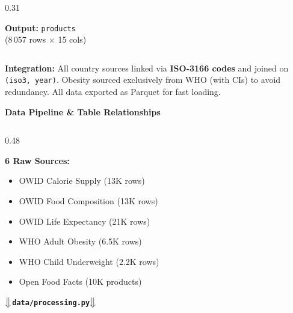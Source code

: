 \documentclass[aspectratio=169, 10pt]{beamer}
\begin{document}
\begin{frame}
\begin{columns}[T]
\begin{column}{0.31\textwidth}
\begin{tcolorbox}[obox, title={\scriptsize\bfseries Q3: What's in our food?},
      coltitle=white, colbacktitle=NOrange]
      \textbf{Output:} \texttt{products}\\(8\,057 rows $\times$ 15 cols)
    \end{tcolorbox}
  \end{column}
\end{columns}
\vspace{3pt}
\begin{tcolorbox}[dbox]
  \footnotesize
  \textbf{Integration:} All country sources linked via \textbf{ISO-3166 codes}
  and joined on \texttt{(iso3, year)}. Obesity sourced exclusively from WHO
  (with CIs) to avoid redundancy. All data exported as Parquet for fast loading.
\end{tcolorbox}
\end{frame}

\begin{frame}
\begin{center}
  {\large\bfseries\textcolor{NDarkGreen}{Data Pipeline \& Table Relationships}}
\end{center}
\vspace{-4pt}
\begin{columns}[T]
  \begin{column}{0.48\textwidth}
    \begin{tcolorbox}[gbox, title={\footnotesize\bfseries Processing Pipeline},
      coltitle=white, colbacktitle=NGreen]
      \scriptsize
      \textbf{6 Raw Sources:}
      \begin{itemize}\setlength\itemsep{0pt}
        \item OWID Calorie Supply (13K rows)
        \item OWID Food Composition (13K rows)
        \item OWID Life Expectancy (21K rows)
        \item WHO Adult Obesity (6.5K rows)
        \item WHO Child Underweight (2.2K rows)
        \item Open Food Facts (10K products)
      \end{itemize}
      \vspace{2pt}
      \centering
      $\big\Downarrow$\quad\texttt{\textbf{data/processing.py}}\quad$\big\Downarrow$
      \vspace{2pt}
      \begin{tcolorbox}[colback=NGreen!15, colframe=NGreen!50, arc=1mm,
        left=1mm, right=1mm, top=0.5mm, bottom=0.5mm]
        \scriptsize

\end{tcolorbox}
\end{tcolorbox}
\end{column}
\end{columns}
\end{frame}
\end{document}
